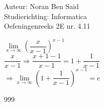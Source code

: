 \documentclass[a4paper]{article}
\begin{document}
\noindent \large Auteur: Noran Ben Said\\
\noindent \large Studierichting: Informatica\\
\noindent \large Oefeningenreeks 2E nr. 4.11\\

\medskip
\normalsize

$ \lim\limits_{x \to\infty}\left(\dfrac{x}{x-1}\right)^{x-1}$\\

$ \dfrac{x}{x-1} \Rightarrow \dfrac{x+1-1}{x-1} = 1 + \dfrac{1}{x-1}   $\\

$\Rightarrow \lim\limits_{x \to\infty}\left(1+\dfrac{1}{x-1}\right)^{x-1} = e$\\



\begin{thebibliography}{999}
\end{thebibliography}
\end{document}
